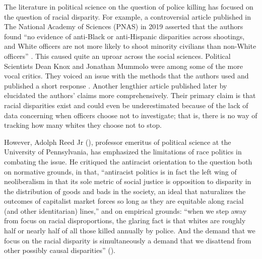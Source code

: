 \documentclass[12pt]{article}
\begin{document}
The literature in political science on the question of police killing has focused on the question of racial disparity. For example, a controversial article published in The National Academy of Sciences (PNAS) in 2019 asserted that the authors found “no evidence of anti-Black or anti-Hispanic disparities across shootings, and White officers are not more likely to shoot minority civilians than non-White officers” \parencite[15877]{johnsonOfficerCharacteristicsRacial2019}. This caused quite an uproar across the social sciences. Political Scientists Dean Knox and Jonathan Mummolo were among some of the more vocal critics. They voiced an issue with the methods that the authors used and published a short response \parencite{knoxMakingInferencesRacial2020}. Another lengthier article published later by \textcite{knoxAdministrativeRecordsMask2020} elucidated the authors’ claims more comprehensively. Their primary claim is that racial disparities exist and could even be underestimated because of the lack of data concerning when officers choose not to investigate; that is, there is no way of tracking how many whites they choose not to stop.

However, Adolph Reed Jr (\citeyear{reedHowRacialDisparity2016}), professor emeritus of political science at the University of Pennsylvania, has emphasized the limitations of race politics in combating the issue. He critiqued the antiracist orientation to the question both on normative grounds, in that, “antiracist politics is in fact the left wing of neoliberalism in that its sole metric of social justice is opposition to disparity in the distribution of goods and bads in the society, an ideal that naturalizes the outcomes of capitalist market forces so long as they are equitable along racial (and other identitarian) lines,” and on empirical grounds: “when we step away from focus on racial disproportions, the glaring fact is that whites are roughly half or nearly half of all those killed annually by police. And the demand that we focus on the racial disparity is simultaneously a demand that we disattend from other possibly causal disparities” (\cite{reedHowRacialDisparity2016}).
\end{document}
